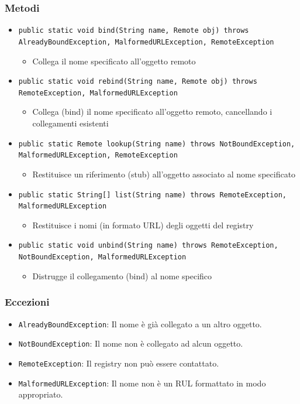 \subsubsection{Metodi}
\begin{itemize}
    \item \texttt{public static void bind(String name, Remote obj) throws AlreadyBoundException, MalformedURLException, RemoteException}
    \begin{itemize}
        \item Collega il nome specificato all'oggetto remoto
    \end{itemize}

    \item \texttt{public static void rebind(String name, Remote obj) throws RemoteException, MalformedURLException}
    \begin{itemize}
        \item Collega (bind) il nome specificato all'oggetto remoto, cancellando i collegamenti esistenti
    \end{itemize}

    \item \texttt{public static Remote lookup(String name) throws NotBoundException, MalformedURLException, RemoteException}
    \begin{itemize}
        \item Restituisce un riferimento (stub) all'oggetto associato al nome specificato
    \end{itemize}

    \item \texttt{public static String[] list(String name) throws RemoteException, MalformedURLException}
    \begin{itemize}
        \item Restituisce i nomi (in formato URL) degli oggetti del registry
    \end{itemize}

    \item \texttt{public static void unbind(String name) throws RemoteException, NotBoundException, MalformedURLException}
    \begin{itemize}
        \item Distrugge il collegamento (bind) al nome specifico
    \end{itemize}
\end{itemize}
\subsubsection{Eccezioni}
\begin{itemize}
    \item \texttt{AlreadyBoundException}: Il nome è già collegato a un altro oggetto.
    \item \texttt{NotBoundException}: Il nome non è collegato ad alcun oggetto.
    \item \texttt{RemoteException}: Il registry non può essere contattato.
    \item \texttt{MalformedURLException}: Il nome non è un RUL formattato in modo appropriato.
\end{itemize}

